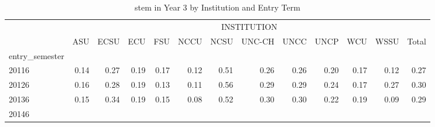 \begin{table}[!h]
\caption{stem in Year 3 by Institution and Entry Term}
\centering
\begin{tabular}{lllllllllllll}
\cline{1-13}
\multicolumn{1}{c}{} &
  \multicolumn{12}{|c}{INSTITUTION} \\
\multicolumn{1}{c}{} &
  \multicolumn{1}{|r}{ASU} &
  \multicolumn{1}{r}{ECSU} &
  \multicolumn{1}{r}{ECU} &
  \multicolumn{1}{r}{FSU} &
  \multicolumn{1}{r}{NCCU} &
  \multicolumn{1}{r}{NCSU} &
  \multicolumn{1}{r}{UNC-CH} &
  \multicolumn{1}{r}{UNCC} &
  \multicolumn{1}{r}{UNCP} &
  \multicolumn{1}{r}{WCU} &
  \multicolumn{1}{r}{WSSU} &
  \multicolumn{1}{r}{Total} \\
\cline{1-13}
\multicolumn{1}{l}{entry\_semester} &
  \multicolumn{1}{|r}{} &
  \multicolumn{1}{r}{} &
  \multicolumn{1}{r}{} &
  \multicolumn{1}{r}{} &
  \multicolumn{1}{r}{} &
  \multicolumn{1}{r}{} &
  \multicolumn{1}{r}{} &
  \multicolumn{1}{r}{} &
  \multicolumn{1}{r}{} &
  \multicolumn{1}{r}{} &
  \multicolumn{1}{r}{} &
  \multicolumn{1}{r}{} \\
\multicolumn{1}{l}{\hspace{1em}20116} &
  \multicolumn{1}{|r}{0.14} &
  \multicolumn{1}{r}{0.27} &
  \multicolumn{1}{r}{0.19} &
  \multicolumn{1}{r}{0.17} &
  \multicolumn{1}{r}{0.12} &
  \multicolumn{1}{r}{0.51} &
  \multicolumn{1}{r}{0.26} &
  \multicolumn{1}{r}{0.26} &
  \multicolumn{1}{r}{0.20} &
  \multicolumn{1}{r}{0.17} &
  \multicolumn{1}{r}{0.12} &
  \multicolumn{1}{r}{0.27} \\
\multicolumn{1}{l}{\hspace{1em}20126} &
  \multicolumn{1}{|r}{0.16} &
  \multicolumn{1}{r}{0.28} &
  \multicolumn{1}{r}{0.19} &
  \multicolumn{1}{r}{0.13} &
  \multicolumn{1}{r}{0.11} &
  \multicolumn{1}{r}{0.56} &
  \multicolumn{1}{r}{0.29} &
  \multicolumn{1}{r}{0.29} &
  \multicolumn{1}{r}{0.24} &
  \multicolumn{1}{r}{0.17} &
  \multicolumn{1}{r}{0.27} &
  \multicolumn{1}{r}{0.30} \\
\multicolumn{1}{l}{\hspace{1em}20136} &
  \multicolumn{1}{|r}{0.15} &
  \multicolumn{1}{r}{0.34} &
  \multicolumn{1}{r}{0.19} &
  \multicolumn{1}{r}{0.15} &
  \multicolumn{1}{r}{0.08} &
  \multicolumn{1}{r}{0.52} &
  \multicolumn{1}{r}{0.30} &
  \multicolumn{1}{r}{0.30} &
  \multicolumn{1}{r}{0.22} &
  \multicolumn{1}{r}{0.19} &
  \multicolumn{1}{r}{0.09} &
  \multicolumn{1}{r}{0.29} \\
\multicolumn{1}{l}{\hspace{1em}20146} &

\end{tabular}
\end{table}
